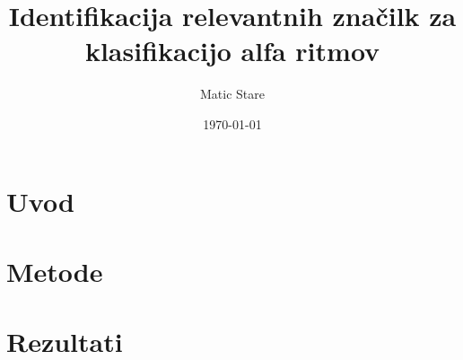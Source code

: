 \documentclass{article}
\begin{document}
\title{Identifikacija relevantnih značilk za klasifikacijo alfa ritmov}
\author{Matic Stare}
\date{\today}



\maketitle

\section{Uvod}
\label{sec:introduction}



\section{Metode}
\label{sec:methodology}


\section{Rezultati}
\label{sec:results}

\end{document}
